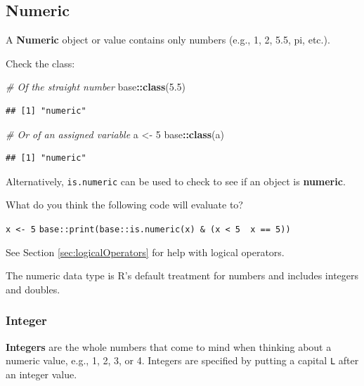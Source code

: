 \documentclass[
]{book}
\newenvironment{Shaded}{\begin{snugshade}}{\end{snugshade}}
\newcommand{\CommentTok}[1]{\textcolor[rgb]{0.56,0.35,0.01}{\textit{#1}}}
\newcommand{\DecValTok}[1]{\textcolor[rgb]{0.00,0.00,0.81}{#1}}
\newcommand{\FloatTok}[1]{\textcolor[rgb]{0.00,0.00,0.81}{#1}}
\newcommand{\FunctionTok}[1]{\textcolor[rgb]{0.13,0.29,0.53}{\textbf{#1}}}
\newcommand{\NormalTok}[1]{#1}
\newcommand{\OtherTok}[1]{\textcolor[rgb]{0.56,0.35,0.01}{#1}}
\newcommand{\SpecialCharTok}[1]{\textcolor[rgb]{0.81,0.36,0.00}{\textbf{#1}}}
\begin{document}
\subsection{Numeric}\label{sec:numeric}

A \textbf{Numeric} object or value contains only numbers (e.g., 1, 2, 5.5, pi, etc.).

Check the class:

\begin{Shaded}
\begin{Highlighting}[]
\CommentTok{\# Of the straight number}
\NormalTok{base}\SpecialCharTok{::}\FunctionTok{class}\NormalTok{(}\FloatTok{5.5}\NormalTok{)}
\end{Highlighting}
\end{Shaded}

\begin{verbatim}
## [1] "numeric"
\end{verbatim}

\begin{Shaded}
\begin{Highlighting}[]
\CommentTok{\# Or of an assigned variable}
\NormalTok{a }\OtherTok{\textless{}{-}} \DecValTok{5}
\NormalTok{base}\SpecialCharTok{::}\FunctionTok{class}\NormalTok{(a)}
\end{Highlighting}
\end{Shaded}

\begin{verbatim}
## [1] "numeric"
\end{verbatim}

Alternatively, \texttt{is.numeric} can be used to check to see if an object is \textbf{numeric}.

What do you think the following code will evaluate to?

\texttt{x\ \textless{}-\ 5}
\texttt{base::print(base::is.numeric(x)\ \&\ (x\ \textless{}\ 5\ \textbar{}\ x\ ==\ 5))}

See Section \ref{sec:logicalOperators} for help with logical operators.

The numeric data type is R's default treatment for numbers and includes integers and doubles.

\subsubsection{Integer}\label{sec:int}

\textbf{Integers} are the whole numbers that come to mind when thinking about a numeric value, e.g., 1, 2, 3, or 4. Integers are specified by putting a capital \texttt{L} after an integer value.
\end{document}
